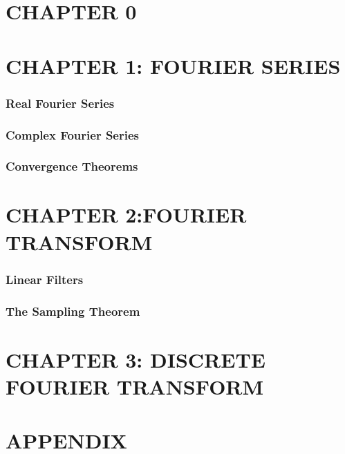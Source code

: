 \documentclass[a4paper]{article}
\begin{document}
\fontsize{8}{6}
\selectfont
\begin{multicols}{2}
\section*{CHAPTER 0}






\section*{CHAPTER 1: FOURIER SERIES}
\subsubsection*{Real Fourier Series}


\subsubsection*{Complex Fourier Series}

\subsubsection*{Convergence Theorems}









\section*{CHAPTER 2:FOURIER TRANSFORM}

\newline



\subsubsection*{Linear Filters}





\subsubsection*{The Sampling Theorem}



\section*{CHAPTER 3: DISCRETE FOURIER TRANSFORM}


\newline


\section*{APPENDIX}


\end{multicols}
\end{document}
